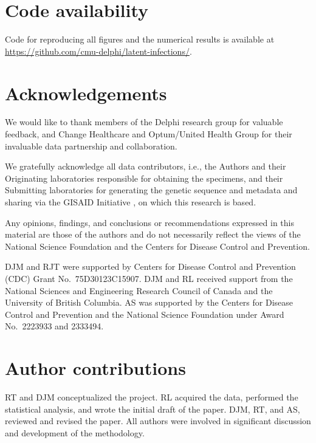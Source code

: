 \documentclass{article}
\begin{document}
\section*{Code availability}
Code for reproducing all figures and the numerical results is 
available at 
\href{https://github.com/cmu-delphi/latent-infections/}{https://github.com/cmu-delphi/latent-infections/}.

\clearpage
%




\section*{Acknowledgements}

We would like to thank members of the Delphi research group for valuable
feedback, and Change Healthcare and Optum/United Health Group for their
invaluable data partnership and collaboration. 

We gratefully acknowledge all
data contributors, i.e., the Authors and their Originating laboratories
responsible for obtaining the specimens, and their Submitting laboratories for
generating the genetic sequence and metadata and sharing via the GISAID
Initiative \citep{elbe2017data}, on which this research is based.

Any opinions, findings, and
conclusions or recommendations expressed in this material are
those of the authors and do not necessarily reflect the views of
the National Science Foundation and the Centers for Disease
Control and Prevention.

DJM and RJT were supported by Centers for Disease Control and Prevention (CDC)
Grant No.\ 75D30123C15907. DJM and RL received support from the National
Sciences and Engineering Research Council of Canada and the University of
British Columbia. AS was supported by the Centers for Disease Control
and Prevention and the National Science Foundation under
Award No.\ 2223933 and 2333494. 


\section*{Author contributions}
RT and DJM conceptualized the project. RL acquired the data, performed the
statistical analysis, and wrote the initial draft of the paper. DJM, RT, and AS,
reviewed and revised the paper. All authors were involved in significant
discussion and development of the methodology.
\end{document}
